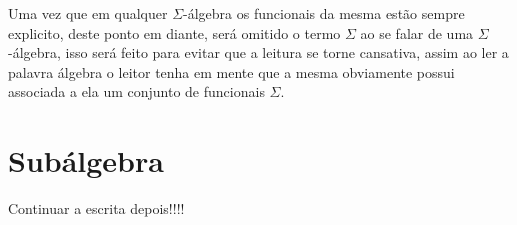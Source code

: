 \begin{nota}
  Uma vez que em qualquer $\Sigma$-álgebra os funcionais da mesma estão sempre explicito, deste ponto em diante, será omitido o termo $\Sigma$ ao se falar de uma $\Sigma$-álgebra, isso será feito para evitar que a leitura se torne cansativa, assim ao ler a palavra álgebra o leitor tenha em mente que a mesma obviamente possui associada a ela um conjunto de funcionais $\Sigma$.
\end{nota}

\section{Subálgebra}\label{sec:SubAlgebra}

{\color{red} Continuar a escrita depois!!!!}
